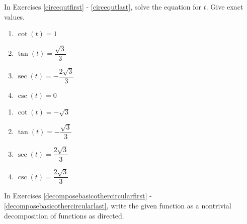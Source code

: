 In Exercises \ref{circequtfirst} - \ref{circequtlast}, solve the equation for $t$.  Give exact values.

\begin{multicols}{4}

\begin{enumerate}

\setcounter{enumi}{\value{HW}}

\item $\cot(t) = 1$  \label{circequtfirst}
\item  $\tan(t) = \dfrac{\sqrt{3}}{3}$ 
\item $\sec(t) = -\dfrac{2\sqrt{3}}{3}$
\item $\csc(t) = 0$  

\setcounter{HW}{\value{enumi}}

\end{enumerate}

\end{multicols}

\begin{multicols}{4}

\begin{enumerate}

\setcounter{enumi}{\value{HW}}

\item $\cot(t) = -\sqrt{3}$  
\item $\tan(t) = -\dfrac{\sqrt{3}}{3}$
\item $\sec(t) = \dfrac{2\sqrt{3}}{3}$
\item $\csc(t) = \dfrac{2\sqrt{3}}{3}$ \label{circequtlast}

\setcounter{HW}{\value{enumi}}

\end{enumerate}

\end{multicols}

In Exercises \ref{decomposebasicothercircularfirst} - \ref{decomposebasicothercircularlast}, write the given function as a nontrivial decomposition of functions as directed.


